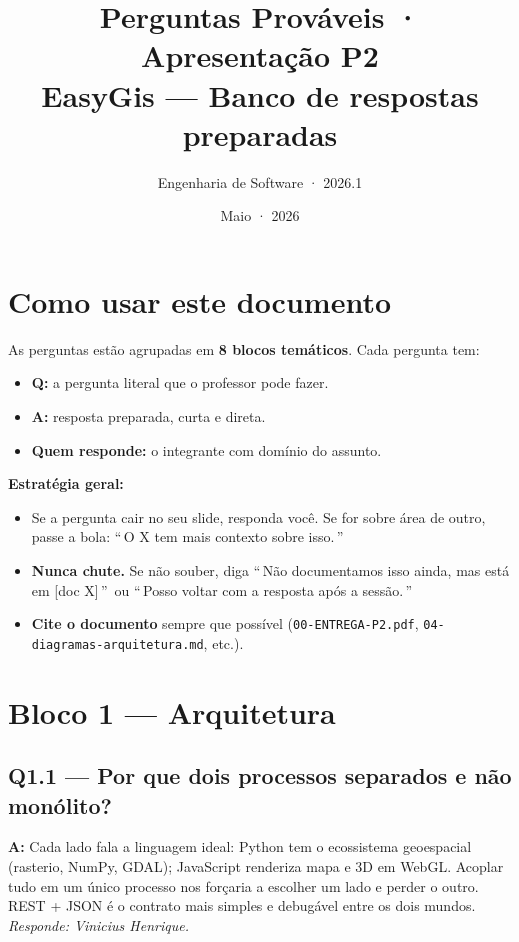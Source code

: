 \documentclass[12pt,a4paper]{article}
\title{\textbf{Perguntas Prováveis · Apresentação P2}\\[6pt]
       \large EasyGis — Banco de respostas preparadas}
\author{Engenharia de Software · 2026.1}
\date{Maio · 2026}
\begin{document}
\maketitle

\section*{Como usar este documento}

As perguntas estão agrupadas em \textbf{8 blocos temáticos}. Cada
pergunta tem:

\begin{itemize}[noitemsep]
  \item \textbf{Q:} a pergunta literal que o professor pode fazer.
  \item \textbf{A:} resposta preparada, curta e direta.
  \item \textbf{Quem responde:} o integrante com domínio do assunto.
\end{itemize}

\textbf{Estratégia geral:}
\begin{itemize}
  \item Se a pergunta cair no seu slide, responda você. Se for sobre área
        de outro, passe a bola: \textquotedblleft\,O X tem mais contexto sobre isso.\,\textquotedblright
  \item \textbf{Nunca chute.} Se não souber, diga \textquotedblleft\,Não
        documentamos isso ainda, mas está em [doc X]\,\textquotedblright\
        ou \textquotedblleft\,Posso voltar com a resposta após a
        sessão.\,\textquotedblright
  \item \textbf{Cite o documento} sempre que possível
        (\texttt{00-ENTREGA-P2.pdf}, \texttt{04-diagramas-arquitetura.md}, etc.).
\end{itemize}

\newpage

\section*{Bloco 1 — Arquitetura}

\subsection*{Q1.1 — Por que dois processos separados e não monólito?}
\textbf{A:} Cada lado fala a linguagem ideal: Python tem o ecossistema
geoespacial (rasterio, NumPy, GDAL); JavaScript renderiza mapa e 3D em WebGL.
Acoplar tudo em um único processo nos forçaria a escolher um lado e perder o
outro. REST + JSON é o contrato mais simples e debugável entre os dois mundos.
\\[2pt] \textit{Responde: Vinicius Henrique.}
\end{document}
